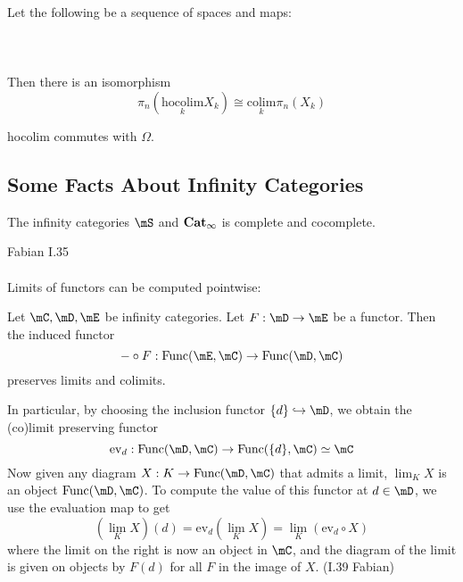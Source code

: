 \documentclass[a4paper]{article}
\begin{document}
\begin{prp}{}{} Let the following be a sequence of spaces and maps: \\~\\
\\~\\
Then there is an isomorphism $$\pi_n(\underset{k}{\text{hocolim}}X_k)\cong\underset{k}{\text{colim}}\pi_n(X_k)$$ \cite{FSHT}
\end{prp}

\begin{prp}{}{} hocolim commutes with $\Omega$. 
\end{prp}

\subsection{Some Facts About Infinity Categories}
\begin{prp}{}{} The infinity categories $\mS$ and $\bold{Cat}_\infty$ is complete and cocomplete. 
\end{prp}

Fabian I.35\\~\\

Limits of functors can be computed pointwise: 

\begin{prp}{}{} Let $\mC,\mD,\mE$ be infinity categories. Let $F:\mD\to\mE$ be a functor. Then the induced functor $$-\circ F:\text{Func}(\mE,\mC)\to\text{Func}(\mD,\mC)$$ preserves limits and colimits. 
\end{prp}

In particular, by choosing the inclusion functor $\{d\}\hookrightarrow\mD$, we obtain the (co)limit preserving functor $$\text{ev}_d:\text{Func}(\mD,\mC)\to\text{Func}(\{d\},\mC)\simeq\mC$$ Now given any diagram $X:K\to\text{Func}(\mD,\mC)$ that admits a limit, $\lim_K X$ is an object $\text{Func}(\mD,\mC)$. To compute the value of this functor at $d\in\mD$, we use the evaluation map to get $$\left(\lim_K X\right)(d)=\text{ev}_d\left(\lim_KX\right)=\lim_K(\text{ev}_d\circ X)$$ where the limit on the right is now an object in $\mC$, and the diagram of the limit is given on objects by $F(d)$ for all $F$ in the image of $X$. (I.39 Fabian)
\end{document}
